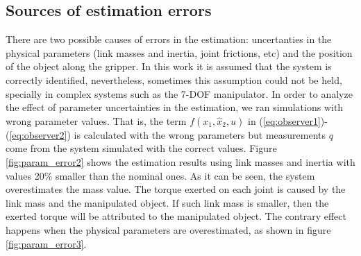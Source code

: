 \documentclass[a4paper, 10pt]{article}
\begin{document}
\subsection{Sources of estimation errors}
There are two possible causes of errors in the estimation: uncertanties in the physical parameters (link masses and inertia, joint frictions, etc) and the position of the object along the gripper. In this work it is assumed that the system is correctly identified, nevertheless, sometimes this assumption could not be held, specially in complex systems such as the 7-DOF manipulator. In order to analyze the effect of parameter uncertainties in the estimation, we ran simulations with wrong parameter values. That is, the term $f(x_1, \hat{x}_2, u)$ in (\ref{eq:observer1})-(\ref{eq:observer2}) is calculated with the wrong parameters but measurements $q$ come from the system simulated with the correct values. Figure \ref{fig:param_error2} shows the estimation results using link masses and inertia with values 20\% smaller than the nominal ones. As it can be seen, the system overestimates the mass value. The torque exerted on each joint is caused by the link mass and the manipulated object. If such link mass is smaller, then the exerted torque will be attributed to the manipulated object. The contrary effect happens when the physical parameters are overestimated, as shown in figure \ref{fig:param_error3}.
\end{document}
